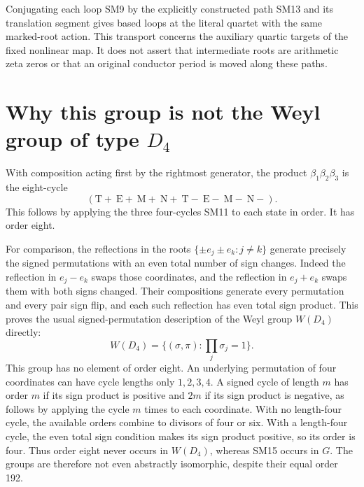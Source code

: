 \documentclass[11pt]{article}
\begin{document}
Conjugating each loop SM9 by the explicitly constructed path
SM13 and its translation segment gives based loops at the literal
quartet with the same marked-root action. This transport concerns
the auxiliary quartic targets of the fixed nonlinear map. It does
not assert that intermediate roots are arithmetic zeta zeros or
that an original conductor period is moved along these paths.

\section{Why this group is not the Weyl group of type $D_4$}
With composition acting first by the rightmost generator, the
product $\beta_1\beta_2\beta_3$ is the eight-cycle
\begin{equation}
 (\mathrm T+\ \mathrm E+\ \mathrm M+\ \mathrm N+\
   \mathrm T-\ \mathrm E-\ \mathrm M-\ \mathrm N-).
 \tag{SM15}
\end{equation}
This follows by applying the three four-cycles SM11 to each
state in order. It has order eight.

For comparison, the reflections in the roots
$\{\pm e_j\pm e_k:j\ne k\}$ generate precisely the signed
permutations with an even total number of sign changes. Indeed
the reflection in $e_j-e_k$ swaps those coordinates, and the
reflection in $e_j+e_k$ swaps them with both signs changed.
Their compositions generate every permutation and every pair
sign flip, and each such reflection has even total sign product.
This proves the usual signed-permutation description of the
Weyl group $W(D_4)$ directly:
\[
 W(D_4)=\{(\sigma,\pi):\prod_j\sigma_j=1\}.
\]
This group has no element of order eight. An underlying
permutation of four coordinates can have cycle lengths only
$1,2,3,4$. A signed cycle of length $m$ has order $m$ if its
sign product is positive and $2m$ if its sign product is
negative, as follows by applying the cycle $m$ times to each
coordinate. With no length-four cycle, the available orders
combine to divisors of four or six. With a length-four cycle,
the even total sign condition makes its sign product positive,
so its order is four. Thus order eight never occurs in $W(D_4)$,
whereas SM15 occurs in $G$. The groups are therefore not even
abstractly isomorphic, despite their equal order 192.
\end{document}
